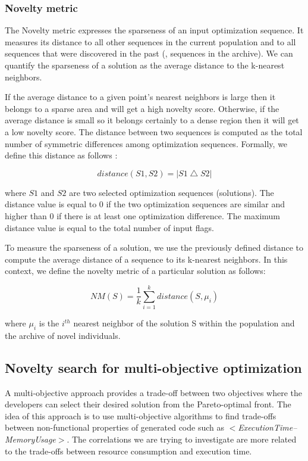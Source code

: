 \subsubsection{Novelty metric}
The Novelty metric expresses the sparseness of an input optimization sequence. It measures its distance to all other sequences in the current population and to all sequences that were discovered in the past (\ie, sequences in the archive). 
We can quantify the sparseness of a solution as the average distance to the k-nearest neighbors. 

If the average distance to a given point's nearest neighbors is large then it belongs to a sparse area and will get a high novelty score. 
Otherwise, if the average distance is small so it belongs certainly to a dense region then it will get a low novelty score. 
The distance between two sequences is computed as the total number of symmetric differences among optimization sequences. Formally, we define this distance as follows :

\begin{equation}
distance(S1,S2)=\left | S1 \bigtriangleup S2 \right |
\end{equation}

where $S1$ and $S2$ are two selected optimization sequences (solutions). The distance value is equal to 0 if the two optimization sequences are similar and higher than 0 if there is at least one optimization difference. The maximum distance value is equal to the total number of input flags.

To measure the sparseness of a solution, we use the previously defined distance to compute the average distance of a sequence to its k-nearest neighbors. In this context, we define the novelty metric of a particular solution as follows:

\begin{equation}
NM(S) = \frac{1}{k} \sum_{i=1}^{k} distance(S,\mu _{i})
\end{equation}

where $\mu _{i}$ is the $i^{th}$ nearest neighbor of the solution S within the population and the archive of novel individuals. 

\subsection{Novelty search for multi-objective optimization}
A multi-objective approach provides a trade-off between two objectives where the developers can select their desired solution from the Pareto-optimal front. The idea of this approach is to use multi-objective algorithms to find trade-offs between non-functional properties of generated code such as \textit{$<$ExecutionTime--MemoryUsage$>$}. The correlations we are trying to investigate are more related to the trade-offs between resource consumption and execution time.

